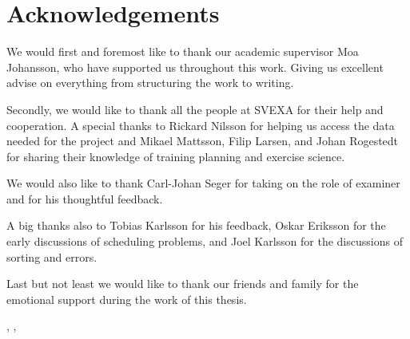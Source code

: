 \thispagestyle{plain}			%
\section*{Acknowledgements}
We would first and foremost like to thank our academic supervisor Moa Johansson, who have supported us throughout this work. Giving us excellent advise on everything from structuring the work to writing.

Secondly, we would like to thank all the people at SVEXA for their help and cooperation.
A special thanks to Rickard Nilsson for helping us access the data needed for the project and Mikael Mattsson, Filip Larsen, and Johan Rogestedt for sharing their knowledge of training planning and exercise science.

We would also like to thank Carl-Johan Seger for taking on the role of examiner and for his thoughtful feedback.

A big thanks also to Tobias Karlsson for his feedback, Oskar Eriksson for the early discussions of scheduling problems, and Joel Karlsson for the discussions of sorting and errors.

Last but not least we would like to thank our friends and family for the emotional support during the work of this thesis.


\vspace{0.25cm}
\hfill
\thesisAuthor, \thesisCity, \thesisMonth\ \thesisYear

\if{}
\newpage				%
\thispagestyle{empty}
\mbox{}
\fi
